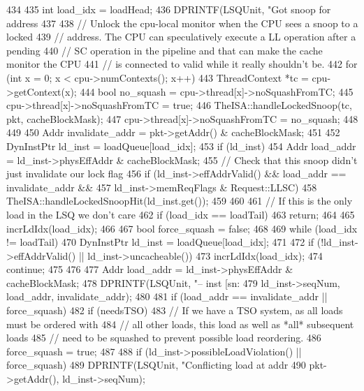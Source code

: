 \begin{DoxyCode}
434 {
435     int load_idx = loadHead;
436     DPRINTF(LSQUnit, "Got snoop for address %
437 
438     // Unlock the cpu-local monitor when the CPU sees a snoop to a locked
439     // address. The CPU can speculatively execute a LL operation after a pending
440     // SC operation in the pipeline and that can make the cache monitor the CPU
441     // is connected to valid while it really shouldn't be.
442     for (int x = 0; x < cpu->numContexts(); x++) {
443         ThreadContext *tc = cpu->getContext(x);
444         bool no_squash = cpu->thread[x]->noSquashFromTC;
445         cpu->thread[x]->noSquashFromTC = true;
446         TheISA::handleLockedSnoop(tc, pkt, cacheBlockMask);
447         cpu->thread[x]->noSquashFromTC = no_squash;
448     }
449 
450     Addr invalidate_addr = pkt->getAddr() & cacheBlockMask;
451 
452     DynInstPtr ld_inst = loadQueue[load_idx];
453     if (ld_inst) {
454         Addr load_addr = ld_inst->physEffAddr & cacheBlockMask;
455         // Check that this snoop didn't just invalidate our lock flag
456         if (ld_inst->effAddrValid() && load_addr == invalidate_addr &&
457             ld_inst->memReqFlags & Request::LLSC)
458             TheISA::handleLockedSnoopHit(ld_inst.get());
459     }
460 
461     // If this is the only load in the LSQ we don't care
462     if (load_idx == loadTail)
463         return;
464 
465     incrLdIdx(load_idx);
466 
467     bool force_squash = false;
468 
469     while (load_idx != loadTail) {
470         DynInstPtr ld_inst = loadQueue[load_idx];
471 
472         if (!ld_inst->effAddrValid() || ld_inst->uncacheable()) {
473             incrLdIdx(load_idx);
474             continue;
475         }
476 
477         Addr load_addr = ld_inst->physEffAddr & cacheBlockMask;
478         DPRINTF(LSQUnit, "-- inst [sn:%
479                     ld_inst->seqNum, load_addr, invalidate_addr);
480 
481         if (load_addr == invalidate_addr || force_squash) {
482             if (needsTSO) {
483                 // If we have a TSO system, as all loads must be ordered with
484                 // all other loads, this load as well as *all* subsequent loads
485                 // need to be squashed to prevent possible load reordering.
486                 force_squash = true;
487             }
488             if (ld_inst->possibleLoadViolation() || force_squash) {
489                 DPRINTF(LSQUnit, "Conflicting load at addr %
490                         pkt->getAddr(), ld_inst->seqNum);
}}}}
\end{DoxyCode}
